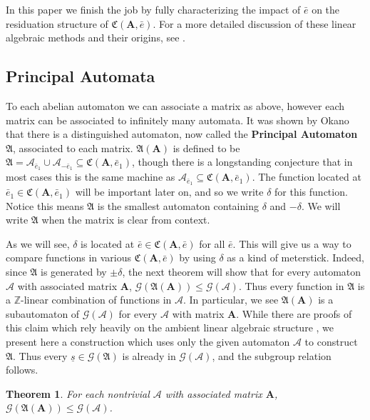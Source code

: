 \documentclass[runningheads]{llncs}
\newcommand{\A}{\mathcal{A}}
\newcommand{\G}{\mathcal{G}}
\renewcommand{\P}{\mathfrak{A}}
\newcommand{\C}{\mathfrak{C}(\Am,\e)}
\newcommand{\Z}{\mathbb{Z}}
\newcommand{\2}{\textbf{2}}
\newcommand{\Am}{\textbf{A}}
\newcommand{\e}{\bar{e}}
\newtheorem{thm}{Theorem}
\begin{document}
In this paper we finish the job by fully
characterizing the impact of $\e$ on the residuation structure of $\C$.
For a more detailed discussion of these linear algebraic methods and their 
origins, see %
\cite{Nekrashevych05:self_similar_groups,NekrashevychSidki04:automorphisms}.

\subsection{Principal Automata}
To each abelian automaton we can associate a matrix as above, however each
matrix can be associated to infinitely many automata.
It was shown by Okano \cite{Okano15:thesis} that there is a 
distinguished automaton, now called the \textbf{Principal Automaton} $\P$, 
associated to each matrix. $\P(\Am)$ is defined to be 
$\P = \A_{\e_1} \cup \A_{-\e_1} \subseteq \mathfrak{C}(\Am, \e_1)$,
though there is a longstanding conjecture that in most cases this is
the same machine as $\A_{\e_1} \subseteq \mathfrak{C}(\Am, \e_1)$.
The function located at $\e_1 \in \mathfrak{C}(\Am, \e_1)$ will be important
later on, and so we write $\delta$ for this function. Notice this means
$\P$ is the smallest automaton containing $\delta$ and $-\delta$.
We will write $\P$ when the matrix is clear from context. 

As we will see, $\delta$ is located at $\e \in \C$ for all $\e$. This will 
give us a way to compare functions in various $\C$ by using $\delta$ as a 
kind of meterstick. Indeed, since $\P$ is generated by $\pm \delta$, the
next theorem will show that for every automaton $\A$ with associated matrix $\Am$, 
$\G(\P(\Am)) \leq \G(\A)$. Thus every function in $\P$ is a $\Z$-linear 
combination of functions in $\A$. In particular, we see
$\P(\Am)$ is a subautomaton of $\G(\A)$ for every $\A$ with matrix $\Am$.
While there are proofs of this claim which rely heavily on the
ambient linear algebraic structure \cite{Okano15:thesis}, 
we present here a construction which uses only the given 
automaton $\A$ to construct $\P$. Thus every $\underline{s} \in \G(\P)$ 
is already in $\G(\A)$, and the subgroup relation follows.

\begin{thm}
  For each nontrivial $\A$ with associated matrix $\Am$,\\
  $\G(\P(\Am)) \leq \G(\A)$.
\end{thm}
\end{document}
